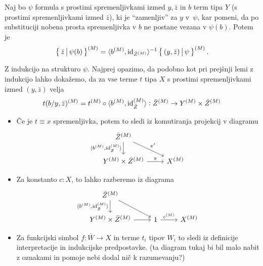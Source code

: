 \documentclass[../kategoricna_logika.tex]{subfiles}
\begin{document}
\begin{lema}\label{lema:substitucija}
  Naj bo $\psi$ formula s prostimi spremenljivkami izmed $y, \bar{z}$
  in $b$ term tipa $Y$ (s prostimi spremenljivkami izmed $\bar{z}$),
  ki je "`zamenljiv"' za $y$ v~$\psi$, kar pomeni, da po substituciji
  nobena prosta spremenljivka v $b$ ne postane vezana v $\psi(b)$.
  Potem je
  $$\left\lbrace\,\bar{z} \,\middle|\, \psi(b)\,\right\rbrace^{(M)} =
  \langle b^{(M)}, \mathrm{id}_{{\bar{Z}}^{(M)}}\rangle^{-1} \left\lbrace\,(y, \bar{z}) \,\middle|\, \psi\,\right\rbrace^{(M)}.$$
\end{lema}
\begin{dokaz}
  Z indukcijo na strukturo $\psi$.  Najprej opazimo, da podobno kot
  pri prejšnji lemi z indukcijo lahko dokažemo, da za vse terme $t$ tipa $X$
  s prostimi spremenljivkami izmed $(y, \bar{z})$ velja
  $$t(b/y, \bar{z})^{(M)} = t^{(M)} \circ \langle b^{(M)}, \mathrm{id}_{\bar{Z}}^{(M)} \rangle : \bar{Z}^{(M)} \to Y^{(M)} \times \bar{Z}^{(M)}$$
  \begin{itemize}
  \item Če je $t \equiv x$ spremenljivka, potem to sledi iz
    komutiranja projekcij v diagramu
    \begin{equation*}
      \begin{tikzcd}
        \bar{Z}^{(M)} \ar[d, "\fprod{b^{(M)}, \mathrm{id}_{\bar{Z}}^{(M)}}"'] \ar[dr, "\pi'"] & \\
        Y^{(M)} \times \bar{Z}^{(M)} \ar[r, "\pi"] & X^{(M)}
      \end{tikzcd}
    \end{equation*}
    
  \item Za konstanto ${c : X}$, to lahko razberemo iz diagrama
    \begin{equation*}
      \begin{tikzcd}
        \bar{Z}^{(M)} \ar[d, "\fprod{b^{(M)}, \mathrm{id}_{\bar{Z}}^{(M)}}"'] \ar[dr] & & \\
        Y^{(M)} \times \bar{Z}^{(M)} \ar[r] & 1 \ar[r, "c^{(M)}"] &
        X^{(M)}
      \end{tikzcd}
    \end{equation*}

  \item Za funkcijski simbol $f : \bar{W} \to X$ in terme $t_i$ tipov
    $W_i$ to sledi iz definicije interpretacije in indukcijske
    predpostavke.  (ta diagram tukaj bi bil malo nabit z oznakami in
    pomoje nebi dodal nič k razumevanju?)
  \end{itemize}


\end{dokaz}
\end{document}
